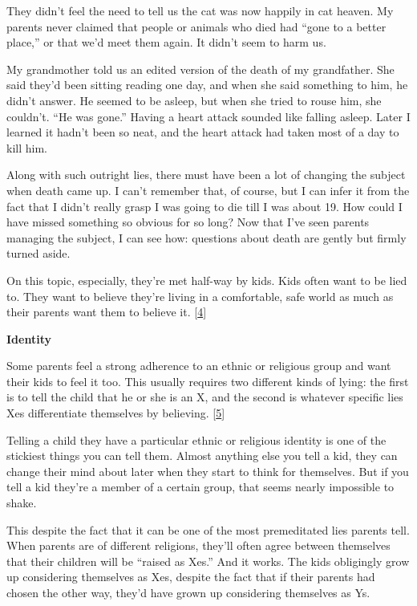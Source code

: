 They didn't feel the need to tell us the cat was now happily in cat
heaven. My parents never claimed that people or animals who died had
``gone to a better place,'' or that we'd meet them again. It didn't seem
to harm us.

My grandmother told us an edited version of the death of my grandfather.
She said they'd been sitting reading one day, and when she said
something to him, he didn't answer. He seemed to be asleep, but when she
tried to rouse him, she couldn't. ``He was gone.'' Having a heart attack
sounded like falling asleep. Later I learned it hadn't been so neat, and
the heart attack had taken most of a day to kill him.

Along with such outright lies, there must have been a lot of changing
the subject when death came up. I can't remember that, of course, but I
can infer it from the fact that I didn't really grasp I was going to die
till I was about 19. How could I have missed something so obvious for so
long? Now that I've seen parents managing the subject, I can see how:
questions about death are gently but firmly turned aside.

On this topic, especially, they're met half-way by kids. Kids often want
to be lied to. They want to believe they're living in a comfortable,
safe world as much as their parents want them to believe it.
{[}\hyperref[f4n]{4}{]}

\textbf{Identity}

Some parents feel a strong adherence to an ethnic or religious group and
want their kids to feel it too. This usually requires two different
kinds of lying: the first is to tell the child that he or she is an X,
and the second is whatever specific lies Xes differentiate themselves by
believing. {[}\hyperref[f5n]{5}{]}

Telling a child they have a particular ethnic or religious identity is
one of the stickiest things you can tell them. Almost anything else you
tell a kid, they can change their mind about later when they start to
think for themselves. But if you tell a kid they're a member of a
certain group, that seems nearly impossible to shake.

This despite the fact that it can be one of the most premeditated lies
parents tell. When parents are of different religions, they'll often
agree between themselves that their children will be ``raised as Xes.''
And it works. The kids obligingly grow up considering themselves as Xes,
despite the fact that if their parents had chosen the other way, they'd
have grown up considering themselves as Ys.

